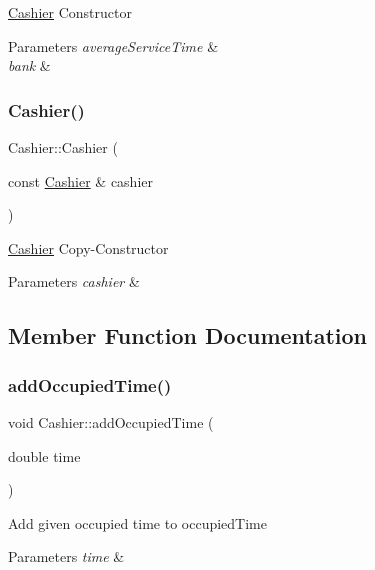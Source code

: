 \hyperlink{classCashier}{Cashier} Constructor 
\begin{DoxyParams}{Parameters}
{\em average\+Service\+Time} & \\
\hline
{\em bank} & \\
\hline
\end{DoxyParams}
\mbox{\label{classCashier_a1a4f6f058122e7c8d47eae5e64334ed6}} 
\subsubsection{\texorpdfstring{Cashier()}{Cashier()}\hspace{0.1cm}{\footnotesize\ttfamily [2/2]}}
{\footnotesize\ttfamily Cashier\+::\+Cashier (\begin{DoxyParamCaption}\item[{const \hyperlink{classCashier}{Cashier} \&}]{cashier }\end{DoxyParamCaption})}

\hyperlink{classCashier}{Cashier} Copy-\/\+Constructor 
\begin{DoxyParams}{Parameters}
{\em cashier} & \\
\hline
\end{DoxyParams}


\subsection{Member Function Documentation}
\mbox{\label{classCashier_a571d08400e1d738163252caa61cbd165}} 
\subsubsection{\texorpdfstring{add\+Occupied\+Time()}{addOccupiedTime()}}
{\footnotesize\ttfamily void Cashier\+::add\+Occupied\+Time (\begin{DoxyParamCaption}\item[{double}]{time }\end{DoxyParamCaption})}

Add given occupied time to occupied\+Time 
\begin{DoxyParams}{Parameters}
{\em time} & \\
\hline
\end{DoxyParams}
\mbox{\label{classCashier_ac04b7595d1d7e51dd673590809cb5682}} 
